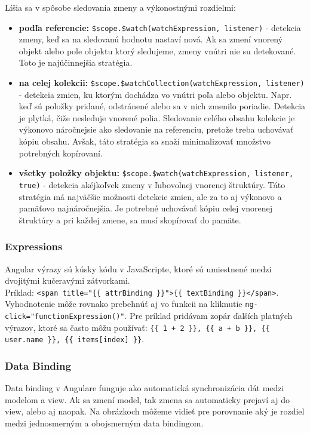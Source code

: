 \noindent Líšia sa v spôsobe sledovania zmeny a výkonostnými rozdielmi:
\begin{itemize}
  \item \textbf{podľa referencie:} \verb|$scope.$watch(watchExpression, listener)| - detekcia zmeny, keď sa na sledovanú hodnotu nastaví nová. Ak sa zmení vnorený objekt alebo pole objektu ktorý sledujeme, zmeny vnútri nie su detekované. Toto je najúčinnejšia stratégia.
  \item \textbf{na celej kolekcii:} \verb|$scope.$watchCollection(watchExpression, listener)| - detekcia zmien, ku ktorým dochádza vo vnútri poľa alebo objektu. Napr. keď sú položky pridané, odstránené alebo sa v nich zmenilo poriadie. Detekcia je plytká, čiže nesleduje vnorené polia. Sledovanie celého obsahu kolekcie je výkonovo náročnejsie ako sledovanie na referenciu, pretože treba uchovávať kópiu obsahu. Avšak, táto stratégia sa snaží minimalizovať množstvo potrebných kopírovaní.
  \item \textbf{všetky položky objektu:} \verb|$scope.$watch(watchExpression, listener, true)| - detekcia akéjkoľvek zmeny v ľubovolnej vnorenej štruktúry. Táto stratégia má najväčšie možnosti detekcie zmien, ale za to aj výkonovo a pamäťovo najnáročnejšia. Je potrebné uchovávať kópiu celej vnorenej štruktúry a pri každej zmene, sa musí skopírovať do pamäte.
\end{itemize}


\subsubsection{Expressions}
Angular výrazy sú kúsky kódu v JavaScripte, ktoré sú umiestnené medzi dvojitými kučeravými zátvorkami.\\
Príklad: \verb|<span title="{{ attrBinding }}">{{ textBinding }}</span>|. Vyhodnotenie môže rovnako prebehnúť aj vo funkcii na kliknutie \verb|ng-click="functionExpression()"|.
Pre príklad pridávam zopár ďalších platných výrazov, ktoré sa často môžu používať: \verb|{{ 1 + 2 }}, {{ a + b }}, {{ user.name }}, {{ items[index] }}|.\cite{angular-docs}





\subsubsection{Data Binding}
Data binding v Angulare funguje ako automatická synchronizácia dát medzi modelom a view. Ak sa zmení model, tak zmena sa automaticky prejaví aj do view, alebo aj naopak.
Na obrázkoch môžeme vidieť pre porovnanie aký je rozdiel medzi jednosmerným a obojsmerným data bindingom.

